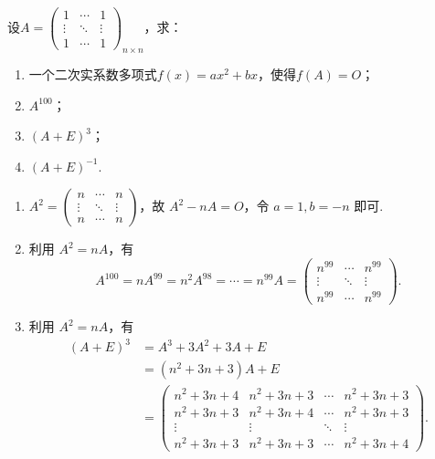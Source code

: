 \begin{exercise}
\begin{exgroup}
        \item 设$A=\begin{pmatrix}
                1      & \cdots & 1      \\
                \vdots & \ddots & \vdots \\
                1      & \cdots & 1
            \end{pmatrix}_{n \times n}$，求：
        \begin{enumerate}
            \item 一个二次实系数多项式$f(x)=ax^2+bx$，使得$f(A)=O$；
            \item $A^{100}$；
            \item $(A+E)^3$；
            \item $(A+E)^{-1}$.
        \end{enumerate}
        \begin{answer}
            \begin{enumerate}
                \item $A^2 = \begin{pmatrix}
                        n      & \cdots & n      \\
                        \vdots & \ddots & \vdots \\
                        n      & \cdots & n
                    \end{pmatrix}$，故 $A^2 - nA = O$，令 $a=1, b=-n$ 即可.

                \item 利用 $A^2 = nA$，有
                    \[
                        A^{100} = n A^{99} = n^2 A^{98} = \cdots = n^{99} A = \begin{pmatrix}
                            n^{99} & \cdots & n^{99} \\
                            \vdots & \ddots & \vdots \\
                            n^{99} & \cdots & n^{99}
                        \end{pmatrix}.
                    \]

                \item 利用 $A^2 = nA$，有
                    \begin{align*}
                        (A+E)^3 &= A^3 + 3A^2 + 3A + E \\
                                &= (n^2 + 3n + 3)A + E \\
                                &= \begin{pmatrix}
                                    n^2 + 3n + 4 & n^2 + 3n + 3 & \cdots & n^2 + 3n + 3 \\
                                    n^2 + 3n + 3 & n^2 + 3n + 4 & \cdots & n^2 + 3n + 3 \\
                                    \vdots & \vdots & \ddots & \vdots \\
                                    n^2 + 3n + 3 & n^2 + 3n + 3 & \cdots & n^2 + 3n + 4
                                \end{pmatrix}.
                    \end{align*}


\end{enumerate}
\end{answer}
\end{exgroup}
\end{exercise}
